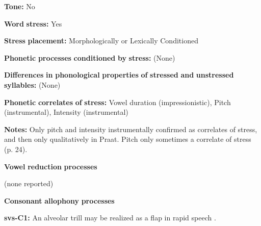 \documentclass[output=paper]{langsci/langscibook}
\begin{document}
\begin{styleBody}
\textbf{Tone:} No
\end{styleBody}

\begin{styleBody}
\textbf{Word} \textbf{stress:} Yes
\end{styleBody}

\begin{styleBody}
\textbf{Stress} \textbf{placement:} Morphologically or Lexically Conditioned
\end{styleBody}

\begin{styleBody}
\textbf{Phonetic} \textbf{processes} \textbf{conditioned} \textbf{by} \textbf{stress:} (None)
\end{styleBody}

\begin{styleBody}
\textbf{Differences} \textbf{in} \textbf{phonological} \textbf{properties} \textbf{of} \textbf{stressed} \textbf{and} \textbf{unstressed} \textbf{syllables:} (None)
\end{styleBody}

\begin{styleBody}
\textbf{Phonetic} \textbf{correlates} \textbf{of} \textbf{stress:} Vowel duration (impressionistic), Pitch (instrumental), Intensity (instrumental)
\end{styleBody}

\begin{styleBody}
\textbf{Notes:} Only pitch and intensity instrumentally confirmed as correlates of stress, and then only qualitatively in Praat. Pitch only sometimes a correlate of stress (p. 24).
\end{styleBody}

\begin{styleBody}
\textbf{Vowel} \textbf{reduction} \textbf{processes}
\end{styleBody}

\begin{styleBody}
(none reported)
\end{styleBody}

\begin{styleBody}
\textbf{Consonant} \textbf{allophony} \textbf{processes}
\end{styleBody}

\begin{styleBody}
\textbf{svs-C1:} An alveolar trill may be realized as a flap in rapid speech \citep[17]{Wegener2010}.
\end{styleBody}
\end{document}
